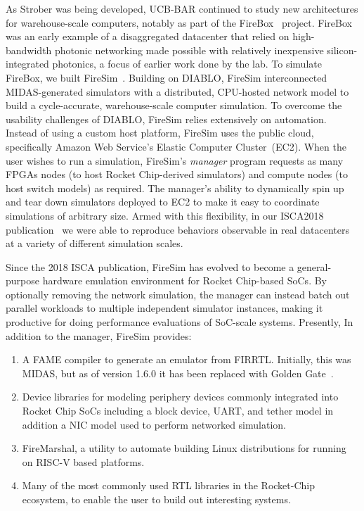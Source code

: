 As Strober was being developed, UCB-BAR continued to study new architectures for
warehouse-scale computers, notably as part of the FireBox~\cite{FireBox} project.
FireBox was an early example of a disaggregated datacenter that relied on
high-bandwidth photonic networking made possible with relatively inexpensive
silicon-integrated photonics, a focus of earlier work done by the lab.  To
simulate FireBox, we built FireSim~\cite{FireSim}. Building on DIABLO, FireSim interconnected MIDAS-generated
simulators with a distributed, CPU-hosted network model to build a
cycle-accurate, warehouse-scale computer simulation. To overcome the usability
challenges of DIABLO, FireSim relies extensively on automation.  Instead of
using a custom host platform, FireSim uses the public cloud, specifically
Amazon Web Service's Elastic Computer Cluster~(EC2).  When the user wishes to run a simulation, FireSim's \emph{manager} program
requests as many FPGAs nodes (to host
Rocket Chip-derived simulators) and compute nodes (to host switch models) as required. The manager's ability to dynamically spin up and tear down simulators
deployed to EC2 to make it easy to coordinate simulations of arbitrary size. Armed with this flexibility, in our
ISCA2018 publication~\cite{FireSim} we were able to reproduce behaviors observable in real
datacenters at a variety of different simulation scales.

Since the 2018 ISCA publication, FireSim has evolved to become a
general-purpose hardware emulation environment for Rocket Chip-based SoCs. By
optionally removing the network simulation, the manager can instead batch out
parallel workloads to multiple independent simulator instances, making it
productive for doing performance evaluations of SoC-scale systems.
Presently, In addition to the manager, FireSim provides:
\begin{enumerate}
    \item A FAME compiler to generate an emulator from FIRRTL. Initially, this
        was MIDAS, but as of version 1.6.0 it has been replaced with Golden Gate~\cite{GoldenGate}.
    \item Device libraries for modeling periphery devices commonly integrated
        into Rocket Chip SoCs including a block device, UART,
        and tether model in addition a NIC model used to perform networked simulation.
    \item FireMarshal, a utility to automate building Linux distributions for
        running on RISC-V based platforms.
    \item Many of the most commonly used RTL libraries in the Rocket-Chip ecosystem, to enable the user to build out interesting systems.
\end{enumerate}

